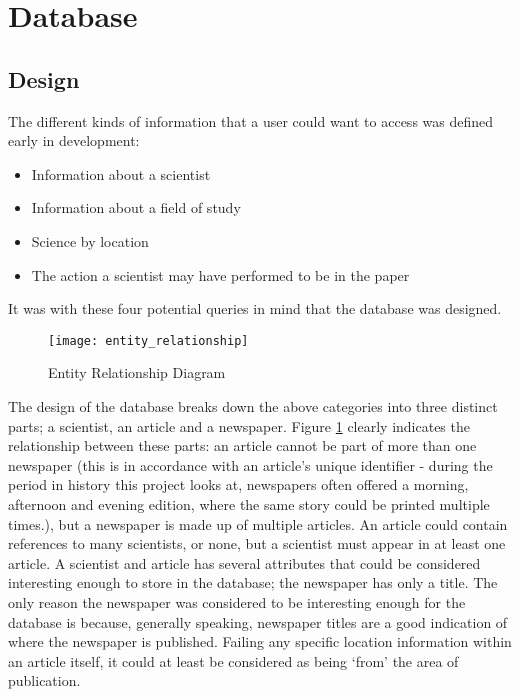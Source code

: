 \documentclass[11pt,a4paper]{book}
\begin{document}
\section{Database}
\subsection{Design}
The different kinds of information that a user could want to access was defined early in development:
\begin{itemize}
	\item Information about a scientist
	\item Information about a field of study
	\item Science by location
	\item The action a scientist may have performed to be in the paper
\end{itemize}
It was with these four potential queries in mind that the database was designed. 
\begin{figure}[H]
	\centering
	\texttt{[image: entity\_relationship]}
	\caption{Entity Relationship Diagram}
	\label{fig:er}
\end{figure}
The design of the database breaks down the above categories into three distinct parts; a scientist, an article and a newspaper. Figure \ref{fig:er} clearly indicates the relationship between these parts: an article cannot be part of more than one newspaper (this is in accordance with an article's unique identifier - during the period in history this project looks at, newspapers often offered a morning, afternoon and evening edition, where the same story could be printed multiple times.), but a newspaper is made up of multiple articles. An article could contain references to many scientists, or none, but a scientist must appear in at least one article. A scientist and article has several attributes that could be considered interesting enough to store in the database; the newspaper has only a title. The only reason the newspaper was considered to be interesting enough for the database is because, generally speaking, newspaper titles are a good indication of where the newspaper is published. Failing any specific location information within an article itself, it could at least be considered as being `from' the area of publication.
\end{document}
